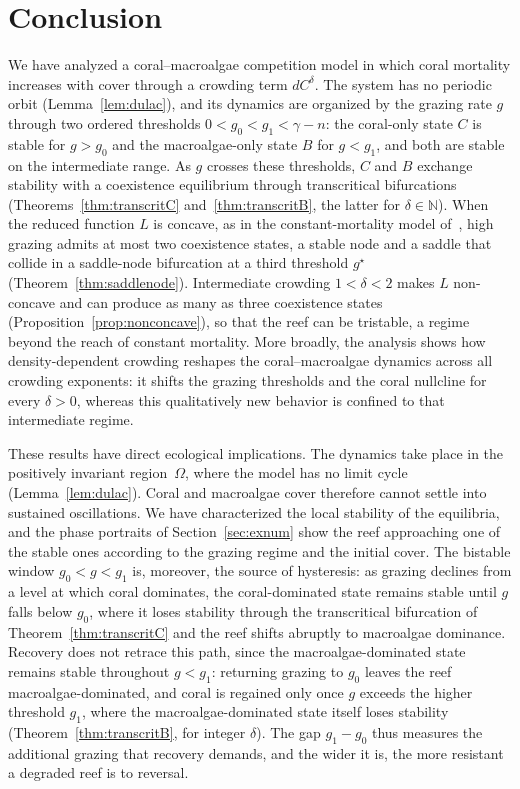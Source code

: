 \documentclass[reqno,11pt]{amsart}
\numberwithin{equation}{section}
\newcommand{\N}{\mathbb{N}}
\begin{document}
\bigskip


\section{Conclusion}\label{sec:conclusion}
We have analyzed a coral--macroalgae competition model in which coral mortality increases with cover through a crowding term $dC^{\delta}$. The system has no periodic orbit (Lemma~\ref{lem:dulac}), and its dynamics are organized by the grazing rate $g$ through two ordered thresholds $0<g_0<g_1<\gamma-n$: the coral-only state $C$ is stable for $g>g_0$ and the macroalgae-only state $B$ for $g<g_1$, and both are stable on the intermediate range. As $g$ crosses these thresholds, $C$ and $B$ exchange stability with a coexistence equilibrium through transcritical bifurcations (Theorems~\ref{thm:transcritC} and~\ref{thm:transcritB}, the latter for $\delta\in\N$). When the reduced function $L$ is concave, as in the constant-mortality model of~\cite{Mum07,Li14}, high grazing admits at most two coexistence states, a stable node and a saddle that collide in a saddle-node bifurcation at a third threshold $g^\star$ (Theorem~\ref{thm:saddlenode}). Intermediate crowding $1<\delta<2$ makes $L$ non-concave and can produce as many as three coexistence states (Proposition~\ref{prop:nonconcave}), so that the reef can be tristable, a regime beyond the reach of constant mortality. More broadly, the analysis shows how density-dependent crowding reshapes the coral--macroalgae dynamics across all crowding exponents: it shifts the grazing thresholds and the coral nullcline for every $\delta>0$, whereas this qualitatively new behavior is confined to that intermediate regime.

These results have direct ecological implications. The dynamics take place in the positively invariant region~$\Omega$, where the model has no limit cycle (Lemma~\ref{lem:dulac}). Coral and macroalgae cover therefore cannot settle into sustained oscillations.
We have characterized the local stability of the equilibria, and the phase portraits of Section~\ref{sec:exnum} show the reef approaching one of the stable ones according to the grazing regime and the initial cover. The bistable window $g_0<g<g_1$ is, moreover, the source of hysteresis: as grazing declines from a level at which coral dominates, the coral-dominated state remains stable until $g$ falls below $g_0$, where it loses stability through the transcritical bifurcation of Theorem~\ref{thm:transcritC} and the reef shifts abruptly to macroalgae dominance. Recovery does not retrace this path, since the macroalgae-dominated state remains stable throughout $g<g_1$: returning grazing to $g_0$ leaves the reef macroalgae-dominated, and coral is regained only once $g$ exceeds the higher threshold $g_1$, where the macroalgae-dominated state itself loses stability (Theorem~\ref{thm:transcritB}, for integer $\delta$). The gap $g_1-g_0$ thus measures the additional grazing that recovery demands, and the wider it is, the more resistant a degraded reef is to reversal.
\end{document}
